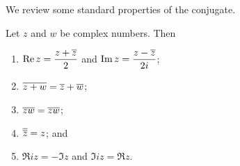 We review some standard properties of the conjugate.

\begin{theorem}
    Let \(z\) and \(w\) be complex numbers. Then
    \begin{enumerate}[label=(\alph*)]
        \item \(\displaystyle\operatorname{Re} z = \frac{z + \overline{z}}{2}\) and \(\displaystyle\operatorname{Im} z = \frac{z - \overline{z}}{2i}\);\label{thm:conjugate-a}
        \item \(\overline{z + w} = \overline{z} + \overline{w}\);
        \item \(\overline{zw} = \overline{z}\overline{w}\);
        \item \(\overline{\overline{z}} = z\); and 
        \item \(\Re iz = -\Im z\) and \(\Im iz = \Re z\).
    \end{enumerate}
    \label{thm:conjugate}
\end{theorem}

